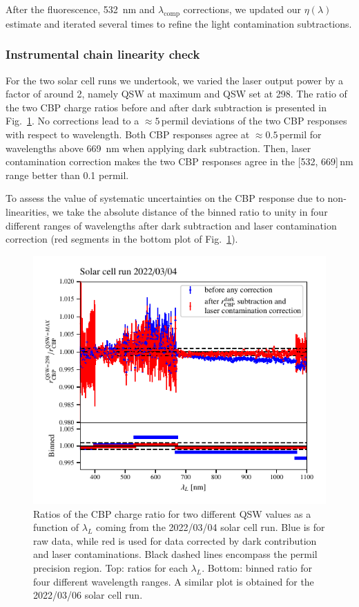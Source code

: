 After the fluorescence, \SI{532}{\nano\meter} and $\lambda_{\mathrm{comp}}$ corrections, we updated our $\eta(\lambda)$ estimate and iterated several times to refine the light contamination subtractions.


\subsubsection{Instrumental chain linearity check}\label{sec:sc_linearity}
For the two solar cell runs we undertook, we varied the laser output power by a factor of around 2, namely QSW at maximum and QSW set at 298. The ratio of the two CBP charge ratios before and after dark subtraction is presented in Fig.~\ref{fig:SCqswlinearity}. No corrections lead to a $\approx 5\,$permil deviations of the two CBP responses with respect to wavelength. Both CBP responses agree at $\approx 0.5\,$permil for wavelengths above \SI{669}{\nano\meter} when applying dark subtraction. Then, laser contamination correction makes the two CBP responses agree in the [532, 669]\,nm range better than 0.1 permil.

To assess the value of systematic uncertainties on the CBP response due to non-linearities, we take the absolute distance of the binned ratio to unity in four different ranges of wavelengths after dark subtraction and laser contamination correction (red segments in the bottom plot of Fig.~\ref{fig:SCqswlinearity}).

\begin{figure}%
    \centering
    \includegraphics[width=\columnwidth]{fig/sc_qsw_ratios.pdf}
    \caption{Ratios of the CBP charge ratio for two different QSW values as a function of $\lambda_L$ coming from the 2022/03/04 solar cell run. Blue is for raw data, while red is used for data corrected by dark contribution and laser contaminations. Black dashed lines encompass the permil precision region. Top: ratios for each $\lambda_L$. Bottom: binned ratio for four different wavelength ranges. A similar plot is obtained for the 2022/03/06 solar cell run.}
    \label{fig:SCqswlinearity}    
\end{figure}


